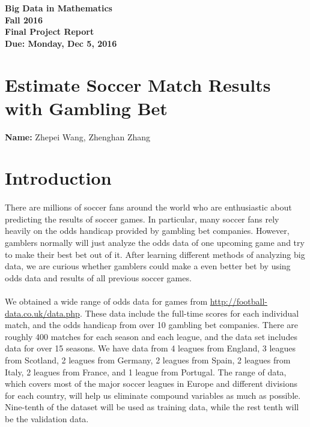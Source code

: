 \documentclass[12pt]{article}
\newcommand{\Name}[1]{\noindent \textbf{Name:} #1 \\}
\begin{document}
\begin{center}
	\bf
	Big Data in Mathematics \\
	Fall 2016 \\
	\rm
	Final Project Report \\
	Due:  Monday, Dec 5, 2016 \\
\end{center}


\section*{Estimate Soccer Match Results with Gambling Bet}

\Name{Zhepei Wang, Zhenghan Zhang} 

\section{Introduction}

\paragraph{}
There are millions of soccer fans around the world who are enthusiastic about predicting the results of soccer games. In particular, many soccer fans rely heavily on the odds handicap provided by gambling bet companies. However, gamblers normally will just analyze the odds data of one upcoming game and try to make their best bet out of it. After learning different methods of analyzing big data, we are curious whether gamblers could make a even better bet by using odds data and results of all previous soccer games.

\paragraph{}
We obtained a wide range of odds data for games from \url{http://football-data.co.uk/data.php}. These data include the full-time scores for each individual match, and the odds handicap from over 10 gambling bet companies. There are roughly 400 matches for each season and each league, and the data set includes data for over 15 seasons. We have data from 4 leagues from England, 3 leagues from Scotland, 2 leagues from Germany, 2 leagues from Spain, 2 leagues from Italy, 2 leagues from France, and 1 league from Portugal. The range of data, which covers most of the major soccer leagues in Europe and different divisions for each country, will help us eliminate compound variables  as much as possible. Nine-tenth of the dataset will be used as training data, while the rest tenth will be the validation data.
\end{document}

